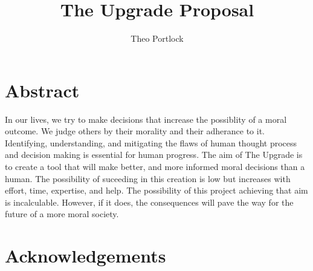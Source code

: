 \documentclass{book}
\title{The Upgrade Proposal}
\author{Theo Portlock}
\begin{document}
\frontmatter
\maketitle

\chapter{Abstract}
In our lives, we try to make decisions that increase the possiblity of a moral outcome.
We judge others by their morality and their adherance to it.
Identifying, understanding, and mitigating the flaws of human thought process and decision making is essential for human progress.
The aim of The Upgrade is to create a tool that will make better, and more informed moral decisions than a human.
The possibility of suceeding in this creation is low but increases with effort, time, expertise, and help.
The possibility of this project achieving that aim is incalculable. However, if it does, the consequences will pave the way for the future of a more moral society.

\cleardoublepage
{}
{}
\tableofcontents

\cleardoublepage
{}
{}
\listoffigures

\cleardoublepage
{}
{}
\listoftables

\mainmatter








\backmatter


\chapter{Acknowledgements}


\end{document}
